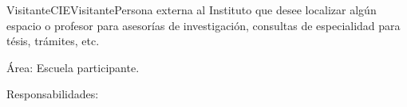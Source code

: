 \begin{actor}{Visitante}{CIEVisitante}{Persona externa al Instituto que desee localizar algún espacio o profesor para asesorías de investigación, consultas de especialidad para tésis, trámites, etc.}

    \item[Área:] Escuela participante.
    \item[Responsabilidades:] \hspace{1pt}

	\begin{itemize}


		  
		  

\end{itemize}
\end{actor}
